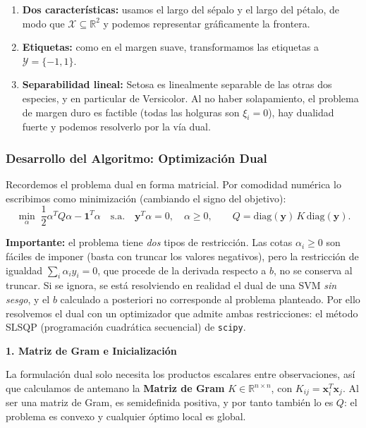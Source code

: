 \documentclass[12pt, a4paper]{article}
\begin{document}
\begin{enumerate}
    \item \textbf{Dos características:} usamos el largo del sépalo y el largo del pétalo, de modo que $\mathcal{X} \subseteq \mathbb{R}^2$ y podemos representar gráficamente la frontera.

    \item \textbf{Etiquetas:} como en el margen suave, transformamos las etiquetas a $\mathcal{Y} = \{-1, 1\}$.

    \item \textbf{Separabilidad lineal:} Setosa es linealmente separable de las otras dos especies, y en particular de Versicolor. Al no haber solapamiento, el problema de margen duro es factible (todas las holguras son $\xi_i = 0$), hay dualidad fuerte y podemos resolverlo por la vía dual.
\end{enumerate}

\subsubsection{Desarrollo del Algoritmo: Optimización Dual}

\noindent Recordemos el problema dual en forma matricial. Por comodidad numérica lo escribimos como minimización (cambiando el signo del objetivo):
\[ \min_{\alpha} \; \frac{1}{2}\alpha^T Q \alpha - \mathbf{1}^T \alpha \quad \text{s.a.} \quad \mathbf{y}^T\alpha = 0, \quad \alpha \geq 0, \qquad Q = \mathrm{diag}(\mathbf{y})\,K\,\mathrm{diag}(\mathbf{y}). \]

\noindent \textbf{Importante:} el problema tiene \textit{dos} tipos de restricción. Las cotas $\alpha_i \geq 0$ son fáciles de imponer (basta con truncar los valores negativos), pero la restricción de igualdad $\sum_i \alpha_i y_i = 0$, que procede de la derivada respecto a $b$, no se conserva al truncar. Si se ignora, se está resolviendo en realidad el dual de una SVM \textit{sin sesgo}, y el $b$ calculado a posteriori no corresponde al problema planteado. Por ello resolvemos el dual con un optimizador que admite ambas restricciones: el método SLSQP (programación cuadrática secuencial) de \texttt{scipy}.

\vspace{0.2cm}
\noindent \textbf{1. Matriz de Gram e Inicialización}

\noindent La formulación dual solo necesita los productos escalares entre observaciones, así que calculamos de antemano la \textbf{Matriz de Gram} $K \in \mathbb{R}^{n \times n}$, con $K_{ij} = \mathbf{x}_i^T \mathbf{x}_j$. Al ser una matriz de Gram, es semidefinida positiva, y por tanto también lo es $Q$: el problema es convexo y cualquier óptimo local es global.
\end{document}
